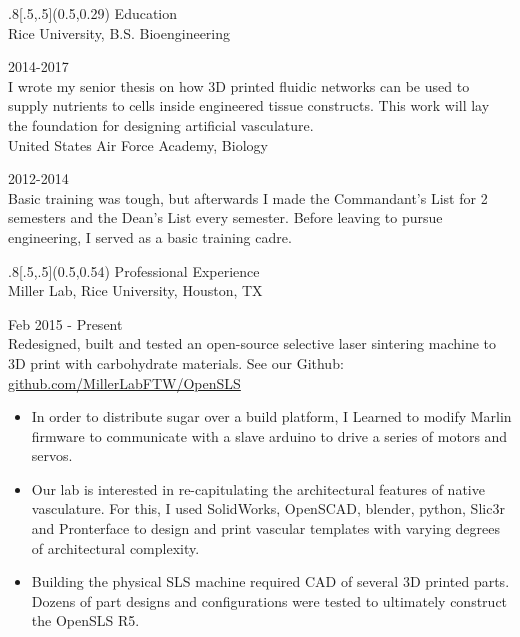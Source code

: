 \documentclass{article}
\begin{document}
\begin{titlepage}
\begin{center}
	
	
	\begin{textblock}{.8}[.5,.5](0.5,0.29)
		{\fontsize{16}{18}\headerfont  Education \\}
		\enspace
		{\fontsize{12}{14}\headerfont Rice University, B.S. Bioengineering}
		\raggedright{\fontsize{12}{14}\regfont \hfill 2014-2017 \\
{\fontsize{12}{14}\bodyfont I wrote my senior thesis on how 3D printed fluidic networks can be used to supply nutrients to cells inside engineered tissue constructs. This work will lay the foundation for designing artificial vasculature. \\}}
		\smallskip
		{\fontsize{12}{14}\headerfont United States Air Force Academy, Biology}
		\raggedright{\fontsize{12}{14}\regfont \hfill 2012-2014 \\
{\fontsize{12}{14}\bodyfont Basic training was tough, but afterwards I made the Commandant's List for 2 semesters and the Dean's List every semester.  Before leaving to pursue engineering, I served as a basic training cadre.\\}}
	\end{textblock}
	
	
	

	
	\begin{textblock}{.8}[.5,.5](0.5,0.54)
		{\fontsize{16}{1}\headerfont  Professional Experience \\}
		\enspace
		{\fontsize{12}{14}\headerfont Miller Lab, Rice University, Houston, TX}
		\raggedright{\fontsize{12}{14}\regfont \hfill Feb 2015 - Present \\
		\smallskip 
		\fontsize{12}{14}\bodyfont Redesigned, built and tested an open-source selective laser sintering machine to 3D print with carbohydrate materials. See our Github: \href{https://github.com/MillerLabFTW/OpenSLS}{github.com/MillerLabFTW/OpenSLS}}
			\begin{itemize}
				\renewcommand{\labelitemi}{\scriptsize$\blacksquare$} 
				\item{ \fontsize{12}{14}\bodyfont In order to distribute sugar over a build platform, I Learned to modify Marlin firmware to communicate with a slave arduino to drive a series of motors and servos.}
				\item{ \fontsize{12}{14}\bodyfont Our lab is interested in re-capitulating the architectural features of native vasculature. For this, I used SolidWorks, OpenSCAD, blender, python, Slic3r and Pronterface to design and print vascular templates with varying degrees of architectural complexity.}
				\item{ \fontsize{12}{14}\bodyfont Building the physical SLS machine required CAD of several 3D printed parts. Dozens of part designs and configurations were tested to ultimately construct the OpenSLS R5.}
			\end{itemize}
			

\end{textblock}
\end{center}
\end{titlepage}
\end{document}
